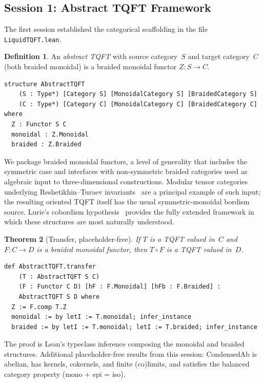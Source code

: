 \documentclass[11pt]{amsart}
\theoremstyle{plain}
\newtheorem{theorem}{Theorem}[section]
\theoremstyle{definition}
\newtheorem{definition}[theorem]{Definition}
\newcommand{\CondAb}{\mathrm{CondensedAb}}
\begin{document}
\subsection{Session 1: Abstract TQFT Framework}

The first session established the categorical scaffolding in the file \texttt{LiquidTQFT.lean}.

\begin{definition}
An \emph{abstract TQFT} with source category~$S$ and target category~$C$ (both braided monoidal) is a braided monoidal functor $Z : S \to C$.
\end{definition}

\begin{lstlisting}
structure AbstractTQFT
    (S : Type*) [Category S] [MonoidalCategory S] [BraidedCategory S]
    (C : Type*) [Category C] [MonoidalCategory C] [BraidedCategory C] where
  Z : Functor S C
  monoidal : Z.Monoidal
  braided : Z.Braided
\end{lstlisting}

We package braided monoidal functors, a level of generality that includes the symmetric case and interfaces with non-symmetric braided categories used as algebraic input to three-dimensional constructions. Modular tensor categories underlying Reshetikhin--Turaev invariants~\cite{ReshetikhinTuraev1991} are a principal example of such input; the resulting oriented TQFT itself has the usual symmetric-monoidal bordism source. Lurie's cobordism hypothesis~\cite{Lurie2009} provides the fully extended framework in which these structures are most naturally understood.

\begin{theorem}[Transfer, placeholder-free]
\label{thm:transfer}
If\/ $T$ is a TQFT valued in~$C$ and $F : C \to D$ is a braided monoidal functor, then $T \circ F$ is a TQFT valued in~$D$.
\end{theorem}

\begin{lstlisting}
def AbstractTQFT.transfer
    (T : AbstractTQFT S C)
    (F : Functor C D) [hF : F.Monoidal] [hFb : F.Braided] :
    AbstractTQFT S D where
  Z := F.comp T.Z
  monoidal := by letI := T.monoidal; infer_instance
  braided := by letI := T.monoidal; letI := T.braided; infer_instance
\end{lstlisting}

The proof is Lean's typeclass inference composing the monoidal and braided structures. Additional placeholder-free results from this session: $\CondAb$ is abelian, has kernels, cokernels, and finite (co)limits, and satisfies the balanced category property (mono + epi = iso).
\end{document}
